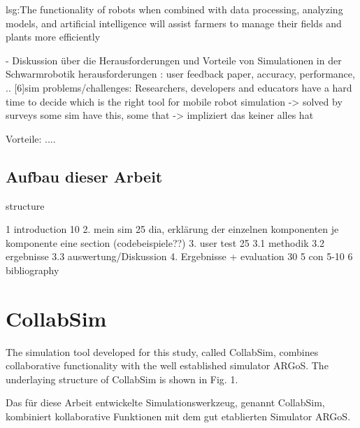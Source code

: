\documentclass[german,version-2020-11]{uzl-thesis}
\begin{document}
lsg:The functionality of robots when combined with data processing, analyzing models, and artificial intelligence will assist farmers to manage their fields and plants more efficiently


- Diskussion über die Herausforderungen und Vorteile von Simulationen in der Schwarmrobotik
    herausforderungen : user feedback paper, accuracy, performance, ..
    [6]sim problems/challenges:
      Researchers, developers and educators have a hard time to decide which is the right tool for mobile robot simulation -> solved by surveys
      some sim have this, some that -> impliziert das keiner alles hat


    Vorteile: ....


\section{Aufbau dieser Arbeit}


%

structure 

1 introduction 10%
2. mein sim 25%
dia, erklärung der einzelnen komponenten je komponente eine section (codebeispiele??)
3. user test 25%
3.1 methodik 3.2 ergebnisse 3.3 auswertung/Diskussion
4. Ergebnisse + evaluation 30%
5 con 5-10%
6 bibliography






%

\chapter{CollabSim}%
\label{chapter-use}
The simulation tool developed for this study, called CollabSim, combines collaborative functionality with the well established simulator ARGoS. 
The underlaying structure of CollabSim is shown in Fig. 1.

Das für diese Arbeit entwickelte Simulationswerkzeug, genannt CollabSim, kombiniert kollaborative Funktionen mit dem gut etablierten Simulator ARGoS.
  
\end{document}
